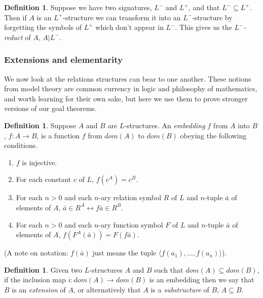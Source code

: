 \documentclass[10pt, a4paper, oneside]{article}
\theoremstyle{definition}
\newtheorem{dfn}[thm]{Definition}
\theoremstyle{remark}
\theoremstyle{plain}
\theoremstyle{plain}
\begin{document}
\begin{dfn}
    Suppose we have two signatures, $L^-$ and $L^+$, and that $L^- \subseteq
    L^+$. Then if $A$ is an $L^+$-structure we can transform it into an
    $L^-$-structure by forgetting the symbols of $L^+$ which don't appear in
    $L^-$. This gives us the \emph{$L^-$-reduct} of $A$, $A| L^-$.
\end{dfn}

\subsubsection{Extensions and elementarity}

We now look at the relations structures can bear to one another. These notions
from model theory are common currency in logic and philosophy of mathematics,
and worth learning for their own sake, but here we use them to prove stronger
versions of our goal theorems.

\begin{dfn}
    Suppose $A$ and $B$ are $L$-structures. An \emph{embedding} $f$ from $A$
    into $B$, $f : A \rightarrow B$, is a function $f$ from $dom(A)$ to $dom(B)$
    obeying the following conditions.

    \begin{enumerate}
        \item $f$ is injective.
        \item For each constant $c$ of $L$, $f(c^A) = c^B$.
        \item For each $n > 0$ and each $n$-ary relation symbol $R$ of $L$ and
              $n$-tuple $\bar{a}$ of elements of $A$, $\bar{a} \in R^A
              \leftrightarrow f\bar{a} \in R^B$.
        \item For each $n > 0$ and each $n$-ary function symbol $F$ of $L$ and
              $n$-tuple $\bar{a}$ of elements of $A$, $f(F^A(\bar{a})) =
              F(f\bar{a})$.
    \end{enumerate}

    (A note on notation: $f(\bar{a})$ just means the tuple $\langle f(a_1),
    \dotsc, f(a_n) \rangle$).
\end{dfn}

\begin{dfn}
    Given two $L$-structures $A$ and $B$ such that $dom(A) \subseteq dom(B)$, if
    the inclusion map $i : dom(A) \rightarrow dom(B)$ is an embedding then we
    say that $B$ is an \emph{extension} of $A$, or alternatively that $A$ is a
    \emph{substructure} of $B$, $A \subseteq B$.
\end{dfn}
\end{document}

